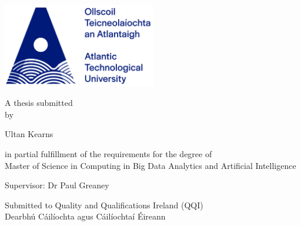 \documentclass[a4paper,11pt]{report}
\begin{document}
\begin{titlepage}
    \begin{center}

    \vspace{30pt}
    \includegraphics[width=0.5\textwidth]{figures/ATULogo.png}\\
    \vspace{50pt}
    
    \fontsize{14}{20} \selectfont
    \vspace{20pt}
    
    A thesis submitted \\
    by\\
    \vspace{10pt}
    
    {\huge Ultan Kearns}\\
    \vspace{10pt}
    
     in partial fulfillment of the requirements for the degree of\\ Master of Science in Computing in Big Data Analytics and Artificial Intelligence
    \vspace{20pt}

    
    
    Supervisor: Dr Paul Greaney
    \vspace{30pt}
    
    
Submitted to Quality and Qualifications Ireland (QQI) \\
Dearbhú Cáilíochta agus Cáilíochtaí Éireann
    \centerline{\monthname \quad \the\year}
\end{center}    
\end{titlepage}

\onehalfspace


\setcounter{page}{1}


\tableofcontents
{}
\end{document}
